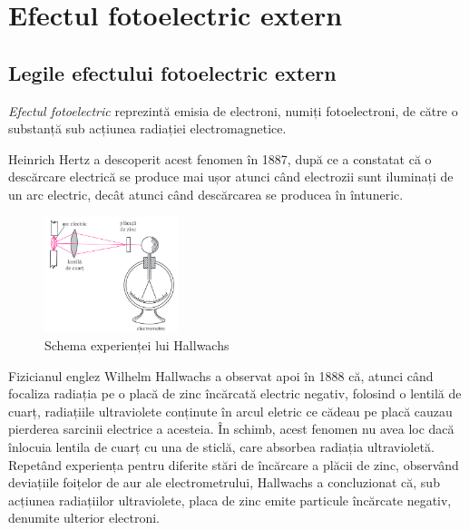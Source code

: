 \section{Efectul fotoelectric extern}

\subsection{Legile efectului fotoelectric extern}

\emph{Efectul fotoelectric} reprezintă emisia de electroni, numiți
fotoelectroni, de către o substanță sub acțiunea radiației electromagnetice.

Heinrich Hertz a descoperit acest fenomen în 1887, după ce a constatat că
o descărcare electrică se produce mai ușor atunci când electrozii sunt iluminați
de un arc electric, decât atunci când descărcarea se producea în întuneric.

\clearpage

\begin{figure}
    \includegraphics[width=0.35\textwidth]{fig/hallwachs}
    \caption{Schema experienței lui Hallwachs}
\end{figure}

Fizicianul englez Wilhelm Hallwachs a observat apoi în 1888 că, atunci când
focaliza radiația pe o placă de zinc încărcată electric negativ, folosind o
lentilă de cuarț, radiațiile ultraviolete conținute în arcul eletric ce cădeau
pe placă cauzau pierderea sarcinii electrice a acesteia. În schimb, acest
fenomen nu avea loc dacă înlocuia lentila de cuarț cu una de sticlă, care
absorbea radiația ultravioletă. Repetând experiența pentru diferite stări
de încărcare a plăcii de zinc, observând deviațiile foițelor de aur ale
electrometrului, Hallwachs a concluzionat că, sub acțiunea radiațiilor
ultraviolete, placa de zinc emite particule încărcate negativ, denumite
ulterior electroni.


